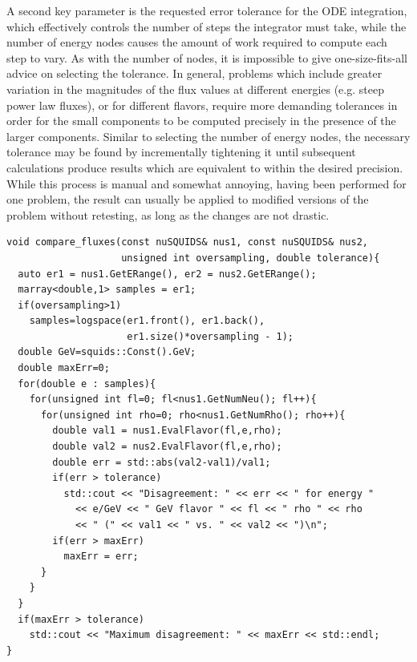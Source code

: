\documentclass[3p,12pt]{elsarticle}
\newcommand{\ttf}{\ttfamily}
\begin{document}
A second key parameter is the requested error tolerance for the ODE integration, which effectively controls the number of steps the integrator must take, while the number of energy nodes causes the amount of work required to compute each step to vary. 
As with the number of nodes, it is impossible to give one-size-fits-all advice on selecting the tolerance. 
In general, problems which include greater variation in the magnitudes of the flux values at different energies (e.g. steep power law fluxes), or for different flavors, require more demanding tolerances in order for the small components to be computed precisely in the presence of the larger components. 
Similar to selecting the number of energy nodes, the necessary tolerance may be found by incrementally tightening it until subsequent calculations produce results which are equivalent to within the desired precision. 
While this process is manual and somewhat annoying, having been performed for one problem, the result can usually be applied to modified versions of the problem without retesting, as long as the changes are not drastic. 

\begin{lstlisting}[float=ht,frame=lines,label=lst:prec_comp,caption={A simple routine for comparing the precision of two different calculations with  {\ttf nuSQuIDS}. Error checking, that numbers of energy ranges, number of flavors, etc. are compatible is advisable, but omitted here for brevity.}]
void compare_fluxes(const nuSQUIDS& nus1, const nuSQUIDS& nus2, 
                    unsigned int oversampling, double tolerance){
  auto er1 = nus1.GetERange(), er2 = nus2.GetERange();
  marray<double,1> samples = er1;
  if(oversampling>1)
    samples=logspace(er1.front(), er1.back(), 
                     er1.size()*oversampling - 1);
  double GeV=squids::Const().GeV;
  double maxErr=0;
  for(double e : samples){
    for(unsigned int fl=0; fl<nus1.GetNumNeu(); fl++){
      for(unsigned int rho=0; rho<nus1.GetNumRho(); rho++){
        double val1 = nus1.EvalFlavor(fl,e,rho);
        double val2 = nus2.EvalFlavor(fl,e,rho);
        double err = std::abs(val2-val1)/val1;
        if(err > tolerance)
          std::cout << "Disagreement: " << err << " for energy " 
            << e/GeV << " GeV flavor " << fl << " rho " << rho
            << " (" << val1 << " vs. " << val2 << ")\n";
        if(err > maxErr)
          maxErr = err;
      }
    }
  }
  if(maxErr > tolerance)
    std::cout << "Maximum disagreement: " << maxErr << std::endl;
}
\end{lstlisting}
\end{document}
